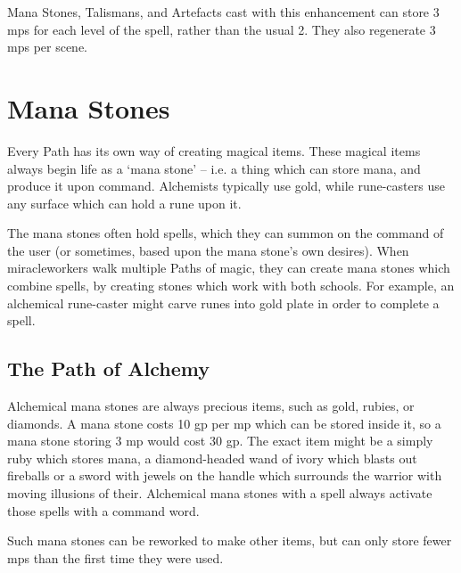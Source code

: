 \begin{multicols}{2}
\spelllevel


Mana Stones, Talismans, and Artefacts cast with this enhancement can store 3 \glspl{mp} for each level of the spell, rather than the usual 2.
They also regenerate 3 \glspl{mp} per scene.

\stopcontents[magic]

\end{multicols}

\section{Mana Stones}

\begin{multicols}{2}

\noindent
Every Path has its own way of creating magical items.
These magical items always begin life as a `mana stone' -- i.e. a thing which can store mana, and produce it upon command.
Alchemists typically use gold, while rune-casters use any surface which can hold a rune upon it.

The mana stones often hold spells, which they can summon on the command of the user (or sometimes, based upon the mana stone's own desires).
When \glspl{miracleworker} walk multiple Paths of magic, they can create mana stones which combine spells, by creating stones which work with both schools.
For example, an alchemical rune-caster might carve runes into gold plate in order to complete a spell.

\subsection{The Path of Alchemy}


Alchemical mana stones are always precious items, such as gold, rubies, or diamonds.
A mana stone costs 10 gp per \gls{mp} which can be stored inside it, so a mana stone storing 3 \gls{mp} would cost 30 gp.
The exact item might be a simply ruby which stores mana, a diamond-headed wand of ivory which blasts out fireballs or a sword with jewels on the handle which surrounds the warrior with moving illusions of their.
Alchemical mana stones with a spell always activate those spells with a command word.

Such mana stones can be reworked to make other items, but can only store fewer \glspl{mp} than the first time they were used.


\end{multicols}
